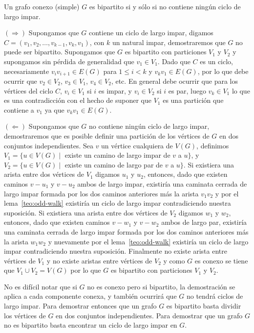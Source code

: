 \begin{teorema}\label{teo:odd-cycle}
Un grafo conexo (simple) $G$  es bipartito si y sólo si no contiene ningún ciclo de largo impar.

\begin{demostracion}
$(\Rightarrow)$ Supongamos que $G$ contiene un ciclo de largo impar, digamos $C=(v_1,v_2,\ldots,v_{k-1},v_k,v_1)$, con $k$ un natural impar, demostraremos que $G$ no puede ser bipartito.
Supongamos que $G$ es bipartito con particiones $V_1$ y $V_2$ y supongamos sin pérdida de generalidad que $v_1\in V_1$.
Dado que $C$ es un ciclo, necesariamente $v_iv_{i+1}\in E(G)$ para $1\leq i< k$ y $v_kv_1\in E(G)$, por lo que debe ocurrir que $v_2\in V_2$, $v_3\in V_1$, $v_4\in V_2$, etc. 
En general debe ocurrir que para los vértices del ciclo $C$, $v_i\in V_1$ si $i$ es impar, y $v_i\in V_2$ si $i$ es par, luego $v_k\in V_1$ lo que es una contradicción con el hecho de suponer que $V_1$ es una partición que contiene a $v_1$ ya que $v_kv_1\in E(G)$.

$(\Leftarrow)$ Supongamos que $G$ no contiene ningún ciclo de largo impar, demostraremos que es posible definir una partición de los vértices de $G$ en dos conjuntos independientes.
Sea $v$ un vértice cualquiera de $V(G)$, definimos $V_1=\{u\in V(G)\;|\;$ existe un camino de largo impar de $v$ a $u\}$, y $V_2=\{u\in V(G)\;|\;$ existe un camino de largo par de $v$ a $u\}$.
Si existiera una arista entre dos vértices de $V_1$ digamos $u_1$ y $u_2$, entonces, dado que existen caminos $v-u_1$ y $v-u_2$ ambos de largo impar, existiría una caminata cerrada de largo impar formada por los dos caminos anteriores más la arista $v_1v_2$ y por el lema~\ref{teo:odd-walk} existiría un ciclo de largo impar contradiciendo nuestra suposición.
Si existiera una arista entre dos vértices de $V_2$ digamos $w_1$ y $w_2$, entonces, dado que existen caminos $v-w_1$ y $v-w_2$ ambos de largo par, existiría una caminata cerrada de largo impar formada por los dos caminos anteriores más la arista $w_1w_2$ y nuevamente por el lema~\ref{teo:odd-walk} existiría un ciclo de largo impar contradiciendo nuestra suposición.
Finalmente no existe arista entre vértices de $V_1$ y no existe aristas entre vértices de $V_2$ y como $G$ es conexo se tiene que $V_1\cup V_2=V(G)$ por lo que $G$ es bipartito con particiones $V_1$ y $V_2$.
\end{demostracion}
\end{teorema}

No es difícil notar que si $G$ no es conexo pero si bipartito, la demostración se aplica a cada componente conexa, y también ocurrirá que $G$ no tendrá ciclos de largo impar.
Para demostrar entonces que un grafo $G$ es bipartito basta dividir los vértices de $G$ en dos conjuntos independientes.
Para demostrar que un grafo $G$ no es bipartito basta encontrar un ciclo de largo impar en $G$.

